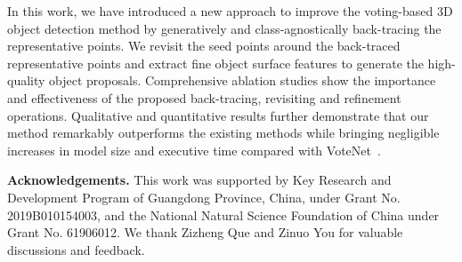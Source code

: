 \documentclass[final]{cvpr}
\begin{document}
In this work, we have introduced a new approach to improve the voting-based 3D object detection method by generatively and class-agnostically back-tracing the representative points.
We revisit the seed points around the back-traced representative points and extract fine object surface features to generate the high-quality object proposals.
Comprehensive ablation studies show the importance and effectiveness of the proposed back-tracing, revisiting and refinement operations. 
Qualitative and quantitative results further demonstrate that our method remarkably outperforms the existing methods while bringing negligible increases in model size and executive time compared with VoteNet~\cite{votenet}.


\vspace{+1mm}
\noindent\textbf{Acknowledgements.} This work was supported by Key Research and Development Program of Guangdong Province, China, under Grant No. 2019B010154003, and the National Natural Science Foundation of China under Grant No. 61906012. We thank Zizheng Que and Zinuo You for valuable discussions and feedback.

{\small


}

\clearpage



\setcounter{table}{0}
\setcounter{figure}{0}
\setcounter{section}{0}
\renewcommand\thesection{\Alph{section}}
\renewcommand{\thefigure}{S\arabic{figure}}
\renewcommand{\thetable}{S\arabic{table}}

\begin{table}[b]
    \caption{3D object detection results on ScanNetV2 dataset with multiple IoU thresholds. *Note that H3DNet~\cite{h3dnet} only provide the checkpoint with  PointNet++ backbones as we use here.}
    \vspace{+2mm}
    \label{scannet@0.75}
\end{table}
\end{document}
